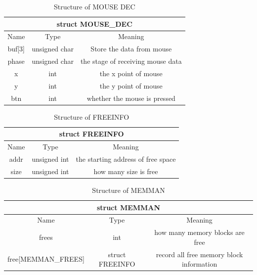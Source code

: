 \documentclass{swfcthesis}
\begin{document}
\begin{table}[!htbp]
  \centering
  \begin{tabular}[c]{|c|c|c|}
    \hline
    \multicolumn{3}{|c|}{struct MOUSE\_DEC} \\
    \hline
    Name & Type & Meaning \\
    \hline
    buf[3] & unsigned char & Store the data from mouse \\
    \hline
    phase & unsigned char & the stage of receiving mouse data \\
    \hline
    x & int & the x point of mouse \\
    \hline
    y & int & the y point of mouse \\
    \hline
    btn & int & whether the mouse is pressed \\
    \hline
  \end{tabular}
  \caption{Structure of MOUSE DEC}
  \label{tab:MOUSE-DEC}
\end{table}

\begin{table}[!htbp]
  \centering
  \begin{tabular}[c]{|c|c|c|}
    \hline
    \multicolumn{3}{|c|}{struct FREEINFO} \\
    \hline
    Name & Type & Meaning \\
    \hline
    addr & unsigned int & the starting address of free space \\
    \hline
    size & unsigned int & how many size is free \\
    \hline
  \end{tabular}
  \caption{Structure of FREEINFO}
  \label{tab:FREEINFO}
\end{table}

\begin{table}[!htbp]
  \centering
  \begin{tabular}[c]{|c|c|c|}
    \hline
    \multicolumn{3}{|c|}{struct MEMMAN} \\
    \hline
    Name & Type & Meaning \\
    \hline
    frees & int & how many memory blocks are free \\
    \hline
    free[MEMMAN\_FREES] & struct FREEINFO & record all free memory block information \\
    \hline
    
  \end{tabular}
  \caption{Structure of MEMMAN}
  \label{tab:MEMMAN}
\end{table}
\end{document}
